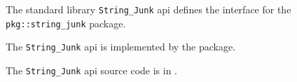 
The standard library {\tt String\_Junk} api defines the interface for the {\tt pkg::string\_junk} package.

The {\tt String\_Junk} api is implemented by the 
 package.

The {\tt String\_Junk} api source code is in .
